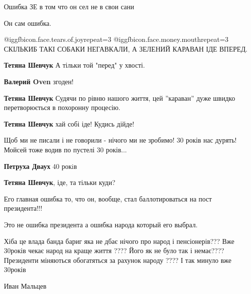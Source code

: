 \begin{itemize}
Ошибка ЗЕ в том что он сел не в свои сани

Он сам ошибка.


 @igg{fbicon.face.tears.of.joy}{repeat=3}
 @igg{fbicon.face.money.mouth}{repeat=3} СКІЛЬКИБ ТАКІ СОБАКИ НЕГАВКАЛИ, А
 ЗЕЛЕНИЙ КАРАВАН ІДЕ ВПЕРЕД.

\begin{itemize} %
\textbf{Тетяна Шевчук} А тільки той "перед" у хвості.

\textbf{Валерий Oven} згоден!

\textbf{Тетяна Шевчук} Судячи по рівню нашого життя, цей ''караван'' дуже швидко перетворюється в похоронну процесію.

\textbf{Тетяна Шевчук} хай собі іде! Кудись дійде!

Щоб ми не писали і не говорили - нічого ми не зробимо! 30 років нас дурять! Мойсей тоже водив по пустелі 30 років...

\textbf{Петруха Дваух} 40 рокiв

\textbf{Тетяна Шевчук}, іде, та тільки куди?
\end{itemize} %

Его главная ошибка то, что он, вообще, стал баллотироваться на пост президента!!!

Это не ошибка президента а ошибка народа который его выбрал.


Хіба це влада банда бариг яка не дбає нічого про народ і пенсіонерів???
Вже 30років чекає народ на краще життя ????
Його як не було так і немає????
Президенти міняються обогатяться за рахунок народу ????
І так минуло вже 30років


Иван Мальцев


\end{itemize}
